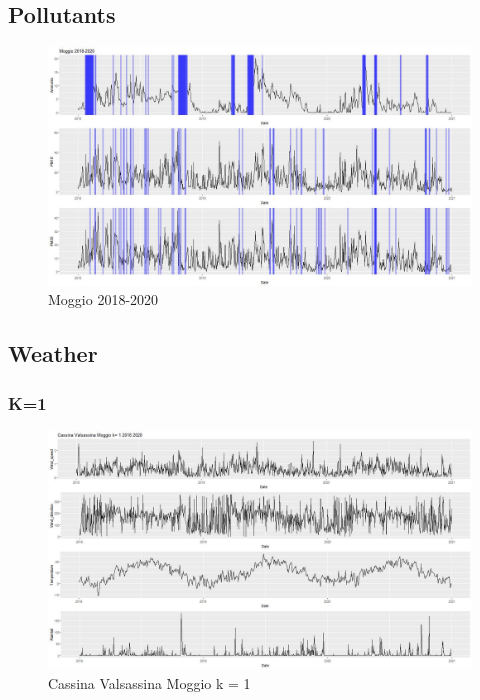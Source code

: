 \documentclass{article}
\begin{document}
\subsection{Pollutants}
\begin{figure}[H]
  \centering
  \includegraphics[scale = 0.4]{Picture/Moggio 2018-2020.jpeg}
  \caption{Moggio 2018-2020}
  \centering
\end{figure}
\subsection{Weather}
\subsubsection{K=1}
\begin{figure}[H]
  \centering 
  \includegraphics[scale = 0.3]{Picture/1/Cassina Valsassina Moggio k= 1 2018 2020 .jpeg}
  \caption{Cassina Valsassina Moggio k = 1 }
  \centering
\end{figure}
\end{document}
